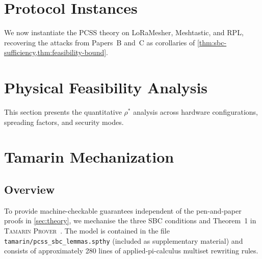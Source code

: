 \documentclass[journal,compsoc]{IEEEtran}
\theoremstyle{plain}
\theoremstyle{definition}
\theoremstyle{remark}
\newcommand{\rhostar}{\rho^*}
\begin{document}












\section{Protocol Instances}
\label{sec:instances}

We now instantiate the PCSS theory on LoRaMesher, Meshtastic, and RPL,
recovering the attacks from Papers~B and~C as corollaries of
\cref{thm:sbc-sufficiency,thm:feasibility-bound}.



\section{Physical Feasibility Analysis}
\label{sec:feasibility}

This section presents the quantitative $\rhostar$ analysis across hardware
configurations, spreading factors, and security modes.



\section{Tamarin Mechanization}
\label{sec:tamarin}

\subsection{Overview}

To provide machine-checkable guarantees independent of the pen-and-paper
proofs in \cref{sec:theory}, we mechanise the three SBC conditions and
Theorem~1 in \textsc{Tamarin Prover}~\cite{meier2013tamarin}.  The model
is contained in the file \texttt{tamarin/pcss\_sbc\_lemmas.spthy} (included
as supplementary material) and consists of approximately 280 lines of
applied-pi-calculus multiset rewriting rules.
\end{document}
